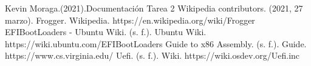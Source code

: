 \documentclass{article}
\begin{document}
\begin{thebibliography}{0}
   Kevin Moraga.(2021).Documentación Tarea 2
   Wikipedia contributors. (2021, 27 marzo). Frogger. Wikipedia. https://en.wikipedia.org/wiki/Frogger 
   EFIBootLoaders - Ubuntu Wiki. (s. f.). Ubuntu Wiki. https://wiki.ubuntu.com/EFIBootLoaders
   Guide to x86 Assembly. (s. f.). Guide. https://www.cs.virginia.edu/%
   Uefi. (s. f.). Wiki. https://wiki.osdev.org/Uefi.inc
  
\end{thebibliography}
\end{document}
